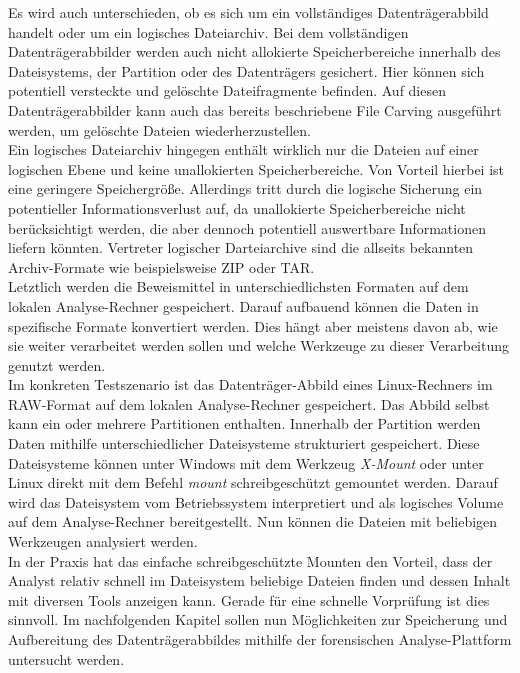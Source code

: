 \noindent
Es wird auch unterschieden, ob es sich um ein vollständiges Datenträgerabbild handelt oder um ein logisches Dateiarchiv. Bei dem vollständigen Datenträgerabbilder werden auch nicht allokierte Speicherbereiche innerhalb des Dateisystems, der Partition oder des Datenträgers gesichert. Hier können sich potentiell versteckte und gelöschte Dateifragmente befinden. Auf diesen Datenträgerabbilder kann auch das bereits beschriebene File Carving ausgeführt werden, um gelöschte Dateien wiederherzustellen.\\ 
Ein logisches Dateiarchiv hingegen enthält wirklich nur die Dateien auf einer logischen Ebene und keine unallokierten Speicherbereiche. Von Vorteil hierbei ist eine geringere Speichergröße. Allerdings tritt durch die logische Sicherung ein potentieller Informationsverlust auf, da unallokierte Speicherbereiche nicht berücksichtigt werden, die aber dennoch potentiell auswertbare Informationen liefern könnten. Vertreter logischer Darteiarchive sind die allseits bekannten Archiv-Formate wie beispielsweise ZIP oder TAR.\\

\noindent
Letztlich werden die Beweismittel in unterschiedlichsten Formaten auf dem lokalen Analyse-Rechner gespeichert. Darauf aufbauend können die Daten in spezifische Formate konvertiert werden. Dies hängt aber meistens davon ab, wie sie weiter verarbeitet werden sollen und welche Werkzeuge zu dieser Verarbeitung genutzt werden.\\

\noindent
Im konkreten Testszenario ist das Datenträger-Abbild eines Linux-Rechners im RAW-Format auf dem lokalen Analyse-Rechner gespeichert. Das Abbild selbst kann ein oder mehrere Partitionen enthalten. Innerhalb der Partition werden Daten mithilfe unterschiedlicher Dateisysteme strukturiert gespeichert. Diese Dateisysteme können unter Windows mit dem Werkzeug \textit{X-Mount} oder unter Linux direkt mit dem Befehl \textit{mount} schreibgeschützt gemountet werden. Darauf wird das Dateisystem vom Betriebssystem interpretiert und als logisches Volume auf dem Analyse-Rechner bereitgestellt. Nun können die Dateien mit beliebigen Werkzeugen analysiert werden.\\

\noindent
In der Praxis hat das einfache schreibgeschützte Mounten den Vorteil, dass der Analyst relativ schnell im Dateisystem beliebige Dateien finden und dessen Inhalt mit diversen Tools anzeigen kann. Gerade für eine schnelle Vorprüfung ist dies sinnvoll. Im nachfolgenden Kapitel sollen nun Möglichkeiten zur Speicherung und Aufbereitung des Datenträgerabbildes mithilfe der forensischen Analyse-Plattform untersucht werden.\\

